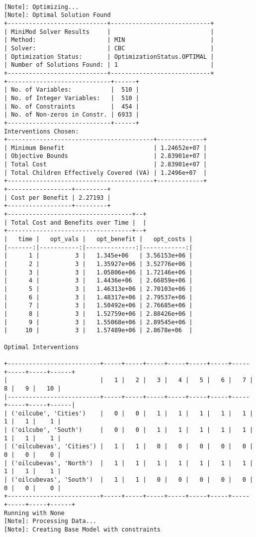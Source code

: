 \documentclass[
]{article}
\begin{document}
\begin{verbatim}
                
[Note]: Optimizing...
[Note]: Optimal Solution Found
+----------------------------+----------------------------+
| MiniMod Solver Results     |                            |
| Method:                    | MIN                        |
| Solver:                    | CBC                        |
| Optimization Status:       | OptimizationStatus.OPTIMAL |
| Number of Solutions Found: | 1                          |
+----------------------------+----------------------------+
+-----------------------------+------+
| No. of Variables:           |  510 |
| No. of Integer Variables:   |  510 |
| No. of Constraints          |  454 |
| No. of Non-zeros in Constr. | 6933 |
+-----------------------------+------+
Interventions Chosen:
+-----------------------------------------+-------------+
| Minimum Benefit                         | 1.24652e+07 |
| Objective Bounds                        | 2.83901e+07 |
| Total Cost                              | 2.83901e+07 |
| Total Children Effectively Covered (VA) | 1.2496e+07  |
+-----------------------------------------+-------------+
+------------------+---------+
| Cost per Benefit | 2.27193 |
+------------------+---------+
+-----------------------------------+--+
| Total Cost and Benefits over Time |  |
+-----------------------------------+--+
|   time |   opt_vals |   opt_benefit |   opt_costs |
|-------:|-----------:|--------------:|------------:|
|      1 |          3 |   1.345e+06   | 3.56153e+06 |
|      2 |          3 |   1.35927e+06 | 3.52776e+06 |
|      3 |          3 |   1.05806e+06 | 1.72146e+06 |
|      4 |          3 |   1.4436e+06  | 2.66859e+06 |
|      5 |          3 |   1.46313e+06 | 2.70103e+06 |
|      6 |          3 |   1.48317e+06 | 2.79537e+06 |
|      7 |          3 |   1.50492e+06 | 2.76685e+06 |
|      8 |          3 |   1.52759e+06 | 2.88426e+06 |
|      9 |          3 |   1.55068e+06 | 2.89545e+06 |
|     10 |          3 |   1.57489e+06 | 2.8678e+06  |

Optimal Interventions

+--------------------------+-----+-----+-----+-----+-----+-----+-----+-----+-----+------+
|                          |   1 |   2 |   3 |   4 |   5 |   6 |   7 |   8 |   9 |   10 |
|--------------------------+-----+-----+-----+-----+-----+-----+-----+-----+-----+------|
| ('oilcube', 'Cities')    |   0 |   0 |   1 |   1 |   1 |   1 |   1 |   1 |   1 |    1 |
| ('oilcube', 'South')     |   0 |   0 |   1 |   1 |   1 |   1 |   1 |   1 |   1 |    1 |
| ('oilcubevas', 'Cities') |   1 |   1 |   0 |   0 |   0 |   0 |   0 |   0 |   0 |    0 |
| ('oilcubevas', 'North')  |   1 |   1 |   1 |   1 |   1 |   1 |   1 |   1 |   1 |    1 |
| ('oilcubevas', 'South')  |   1 |   1 |   0 |   0 |   0 |   0 |   0 |   0 |   0 |    0 |
+--------------------------+-----+-----+-----+-----+-----+-----+-----+-----+-----+------+
Running with None
[Note]: Processing Data...
[Note]: Creating Base Model with constraints


\end{verbatim}
\end{document}
